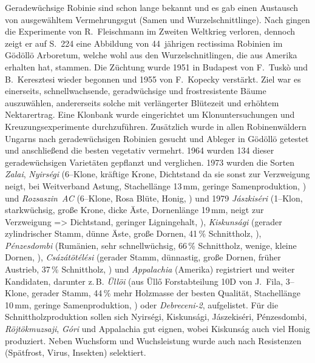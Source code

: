 \documentclass[twocolumn]{scrartcl}
\begin{document}
Geradewüchsige Robinie sind schon lange bekannt und es gab einen
Austausch von ausgewähltem Vermehrungsgut (Samen und
Wurzelschnittlinge). Nach \citep{keresztesi1983robinie} gingen die
Experimente von R.~Fleischmann im Zweiten Weltkrieg verloren, dennoch
zeigt er auf S.~224 eine Abbildung von 44~jährigen rectissima Robinien
im Gödöllö Arboretum, welche wohl aus den Wurzelschnitlingen, die
\cite{mihalyi1937robinie} aus Amerika erhalten hat, stammen. Die
Züchtung wurde 1951 in Budapest von F.~Tuskò und B.~Keresztesi wieder
begonnen und 1955 von F.~Kopecky verstärkt. Ziel war es einerseits, schnellwachsende,
geradwüchsige und frostresistente Bäume auszuwählen, andererseits solche mit
verlängerter Blütezeit und erhöhtem Nektarertrag.
Eine Klonbank wurde eingerichtet um Klonuntersuchungen
und Kreuzungsexperimente durchzuführen. Zusätzlich wurde in allen
Robinenwäldern Ungarns nach geradewüchsigen Robinien gesucht und
Ableger in Gödöllö getestet und anschließend die besten vegetativ
vermehrt. 1964 wurden 134 dieser geradewüchsigen Varietäten gepflanzt
und verglichen. 1973 wurden die Sorten \emph{Zalai}, \emph{Nyirségi}
(6--Klone, kräftige Krone, Dichtstand da sie sonst zur Verzweigung
neigt, bei Weitverband Astung, Stachellänge 13\,mm, geringe
Samenproduktion, \cite{kapusi1995robinie,abri2024dis}) und
\emph{Rozsaszin~AC} (6--Klone, Rosa Blüte, Honig,
\cite{kapusi1995robinie}) und 1979 \emph{Jászkiséri} (1--Klon,
starkwüchsig, große Krone, dicke Äste, Dornenlänge 19\,mm, neigt zur
Verzweigung => Dichtstand, geringer Ligningehalt,
\cite{zsombor1980robinie,kapusi1995robinie,abri2024dis}),
\emph{Kiskunsági} (gerader zylindrischer Stamm, dünne Äste, große
Dornen, 41\,\% Schnittholz, \cite{zsombor1980robinie}),
\emph{Pénzesdombi} (Rumänien, sehr schnellwüchsig, 66\,\% Schnittholz,
wenige, kleine Dornen, \cite{zsombor1980robinie}),
\emph{Csázátötélési} (gerader Stamm, dünnastig, große Dornen, früher
Austrieb, 37\,\% Schnittholz, \cite{zsombor1980robinie}) und
\emph{Appalachia} (Amerika) registriert und weiter Kandidaten,
darunter z.\,B. \emph{Üllöi} (aus Üllő Forstabteilung 10D von J.~Fila,
3--Klone, gerader Stamm, 44\,\% mehr Holzmasse der besten Qualität,
Stachellänge 10\,mm, geringe Samenproduktion,
\cite{bach1983robinie,kapusi1995robinie,abri2024dis,redei2020ulloi}) oder
\emph{Debreceni-2}, aufgelistet. Für die Schnittholzproduktion sollen
sich Nyirségi, Kiskunsági, Jászekiséri, Pénzesdombi,
\emph{Röjtökmuzsaji}, \emph{Góri} und Appalachia gut eignen, wobei
Kiskunság auch viel Honig produziert. Neben Wuchsform und
Wuchsleistung wurde auch nach Resistenzen (Spätfrost, Virus, Insekten)
selektiert.
\end{document}
